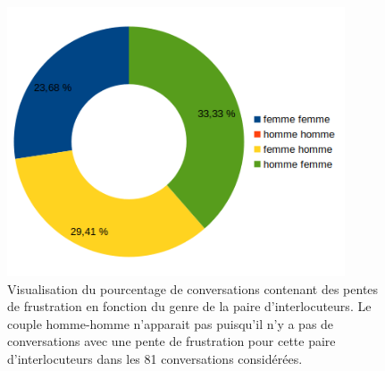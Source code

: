 \begin{figure}[h]
  \centering
  \includegraphics[width=10cm]{./Chapitre7/figures/genre.png}
  \caption{Visualisation du pourcentage de conversations contenant des pentes de frustration en fonction du genre de la paire d'interlocuteurs. Le couple homme-homme n'apparait pas puisqu'il n'y a pas de conversations avec une pente de frustration pour cette paire d'interlocuteurs dans les 81 conversations considérées.}
  \label{fig:genre}
\end{figure}
